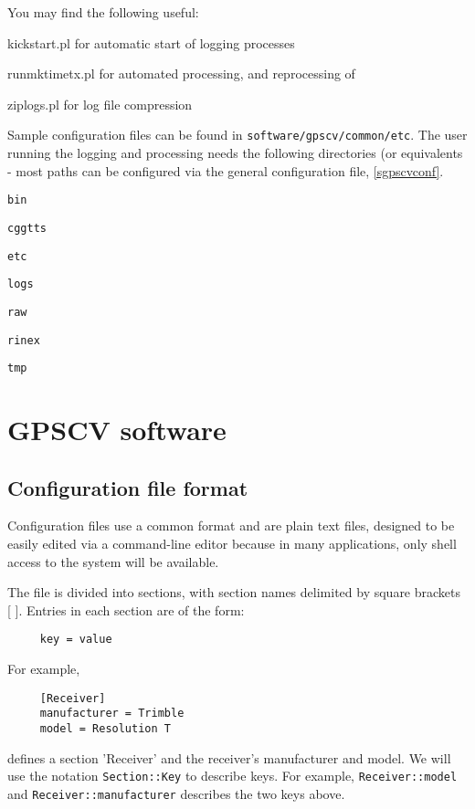 \documentclass[11pt,a4paper,openany,oneside]{book}
\newcommand{\cc}[1]{{\small\texttt{#1}}}
\newenvironment{description*}%
  {\setlength{\parskip}{0pt}%
	 \begin{description}%
		\setlength{\topsep}{-12pt}%
		\setlength{\itemindent}{-12pt}%
    \setlength{\itemsep}{0pt}%
		\setlength{\itemsep}{0pt}}%
  {\end{description}}
\begin{document}
You may find the following useful:
\begin{description*}
	\item[kickstart.pl] for automatic start of logging processes
	\item[runmktimetx.pl] for automated processing, and reprocessing of
	\item[ziplogs.pl] for log file compression
\end{description*}	

Sample configuration files can be found in \cc{software/gpscv/common/etc}.
The user running the logging and processing needs the following directories (or equivalents - most paths
can be configured via the general configuration file, \ref{sgpscvconf}.

\begin{description*}
	\item[\cc{bin}]
	\item[\cc{cggtts}]
	\item[\cc{etc}]
	\item[\cc{logs}]
	\item[\cc{raw}]
	\item[\cc{rinex}]
	\item[\cc{tmp}]
\end{description*}


\chapter{GPSCV software}

\section{Configuration file format \label{sConfigFileFormat}}

Configuration files use a common format and are plain text files, designed to be easily edited via a command-line
editor because in many applications, only shell access to the system will be available.

The file is divided into sections, with section names delimited by square brackets [ ]. Entries in each section
are of the form:
\begin{lstlisting}
	 key = value
\end{lstlisting}
For example,
\begin{lstlisting}
	 [Receiver]
	 manufacturer = Trimble
	 model = Resolution T
\end{lstlisting}
defines a section 'Receiver' and the receiver's manufacturer and model. 
We will use the notation \cc{Section::Key} to describe keys. For example,
\cc{Receiver::model} and \cc{Receiver::manufacturer} describes the two keys above.
\end{document}
